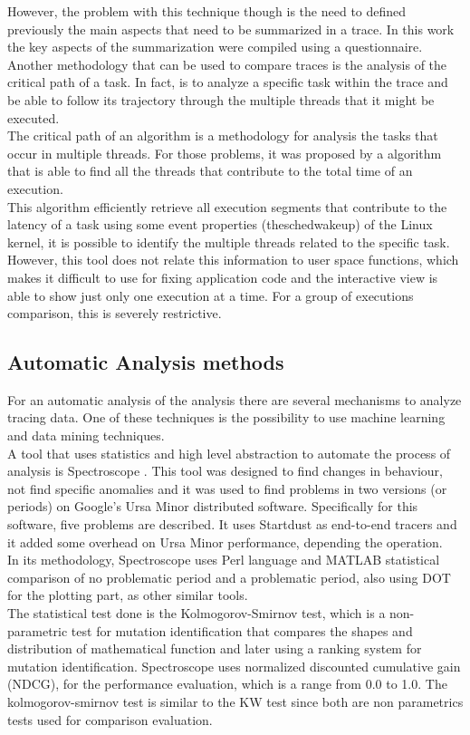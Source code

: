 However, the problem with this technique though is the need to defined previously the main aspects that need to be summarized in a trace. In this work the key aspects of the summarization were compiled using a questionnaire.\\
Another methodology that can be used to compare traces is the analysis of the critical path of a task. In fact, is to analyze a specific task within the trace and be able to follow its trajectory through the multiple threads that it might be executed.\\
The critical path of an algorithm is a methodology for analysis the tasks that occur in multiple threads. For those problems, it was proposed by \cite{francis1} a algorithm that is able to find all the threads that contribute to the total time of an execution. \\
This algorithm efficiently retrieve all execution segments that contribute to the latency of a task using some event properties (thesched\textunderscore wakeup) of the Linux kernel, it is possible to identify the multiple threads related to the specific task. However, this tool does not relate this information to user space functions, which makes it difficult to use for fixing application code and the interactive view is able to show just only one execution at a time. For a group of executions comparison, this is severely restrictive.\\
\subsection{Automatic Analysis methods}
For an automatic analysis of the analysis there are several mechanisms to analyze tracing data. One of these techniques is the possibility to use machine learning and data mining techniques.\\
A tool that uses statistics and high level abstraction to automate the process of analysis is Spectroscope \cite{categorizing_system_behaviour_raja}\cite{Sambasivan2011DPC19724571972463}. This tool was designed to find changes in behaviour, not find specific anomalies and it was used to find problems in two versions (or periods) on Google's Ursa Minor distributed software. Specifically for this software, five problems are described. It uses Startdust as end-to-end tracers and it added some overhead on Ursa Minor performance, depending the operation. \\
In its methodology, Spectroscope uses Perl language and MATLAB statistical comparison of no problematic period and a problematic period, also using DOT for the plotting part, as other similar tools.\\
The statistical test done is the Kolmogorov-Smirnov test,  which is a non-parametric test for mutation identification that compares the shapes and distribution of mathematical function and later using a ranking system for mutation identification. Spectroscope uses normalized discounted cumulative gain (NDCG), for the performance evaluation, which is a range from 0.0 to 1.0. The kolmogorov-smirnov test is similar to the KW test since both are non parametrics tests used for comparison evaluation.\\
